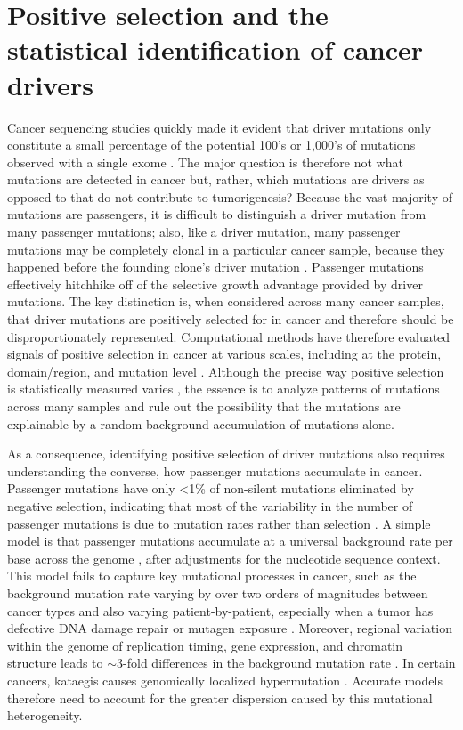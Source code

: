 \section{Positive selection and the statistical identification of cancer drivers}
\label{sec:section}

Cancer sequencing studies quickly made it evident that driver mutations only constitute a small percentage of the potential 100's or 1,000's of mutations observed with a single exome \cite{RN25}. The major question is therefore not what mutations are detected in cancer but, rather, which mutations are drivers as opposed to  that do not contribute to tumorigenesis? Because the vast majority of mutations are passengers, it is difficult to distinguish a driver mutation from many passenger mutations; also, like a driver mutation, many passenger mutations may be completely clonal in a particular cancer sample, because they happened before the founding clone's driver mutation \cite{RN160, RN50}. Passenger mutations effectively hitchhike off of the selective growth advantage provided by driver mutations. The key distinction is, when considered across many cancer samples, that driver mutations are positively selected for in cancer and therefore should be disproportionately represented. Computational methods have therefore evaluated signals of positive selection in cancer at various scales, including at the protein, domain/region, and mutation level \cite{RN52}. Although the precise way positive selection is statistically measured varies \cite{RN49}, the essence is to analyze patterns of mutations across many samples and rule out the possibility that the mutations are explainable by a random background accumulation of mutations alone. 

As a consequence, identifying positive selection of driver mutations also requires understanding the converse, how passenger mutations accumulate in cancer. Passenger mutations have only \textless1\% of non-silent mutations eliminated by negative selection, indicating that most of the variability in the number of passenger mutations is due to mutation rates rather than selection \cite{RN56}. A simple model is that passenger mutations accumulate at a universal background rate per base across the genome \cite{RN3}, after adjustments for the nucleotide sequence context. This model fails to capture key mutational processes in cancer, such as the background mutation rate varying by over two orders of magnitudes between cancer types \cite{RN13} and also varying patient-by-patient, especially when a tumor has defective DNA damage repair or mutagen exposure \cite{RN51}. Moreover, regional variation within the genome of replication timing, gene expression, and chromatin structure leads to $\sim$3-fold differences in the background mutation rate \cite{RN13}. In certain cancers, kataegis causes genomically localized hypermutation \cite{RN164}. Accurate models therefore need to account for the greater dispersion caused by this mutational heterogeneity.

